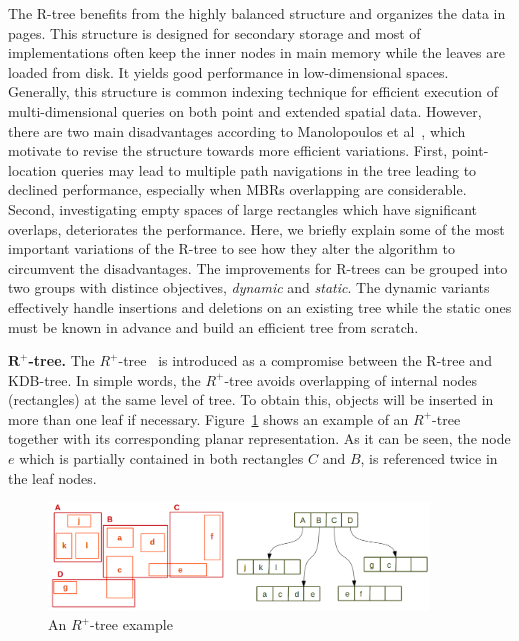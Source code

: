 \documentclass[a4paper,12pt]{article}
\begin{document}
The R-tree benefits from the highly balanced structure and organizes the data in pages. This structure is designed for secondary storage and most of implementations often keep the inner nodes in main memory while the leaves are loaded from disk. It yields good performance in low-dimensional spaces. Generally, this structure is common indexing technique for efficient execution of multi-dimensional queries on both point and extended spatial data. However, there are two main disadvantages according to Manolopoulos et al~\cite{Manolopoulos:2005}, which motivate to revise the structure towards more efficient variations. First, point-location queries may lead to multiple path navigations in the tree leading to declined performance, especially when MBRs overlapping are considerable. Second, investigating empty spaces of large rectangles which have significant overlaps, deteriorates the performance. Here, we briefly explain some of the most important variations of the R-tree to see how they alter the algorithm to circumvent the disadvantages. The improvements for R-trees can be grouped into two groups with distince objectives, \textit{dynamic} and \textit{static}. The dynamic variants effectively handle insertions and deletions on an existing tree while the static ones must be known in advance and build an efficient tree from scratch. 


\textbf{$\boldsymbol{R^+}$-tree.}
The $R^+$-tree~\cite{Sellis:rplustree} is introduced as a compromise between the R-tree and KDB-tree. In simple words, the $R^+$-tree avoids overlapping of internal nodes (rectangles) at the same level of tree. To obtain this, objects will be inserted in more than one leaf if necessary. Figure~\ref{r+tree} shows an example of an $R^+$-tree together with its corresponding planar representation. As it can be seen, the node $e$ which is partially contained in both rectangles $C$ and $B$, is referenced twice in the leaf nodes.


\begin{figure}
\centering
\includegraphics[width=0.9\textwidth]{r+tree}
\caption{An {$R^+$-tree} example}
\label{r+tree}
\end{figure}
\end{document}
